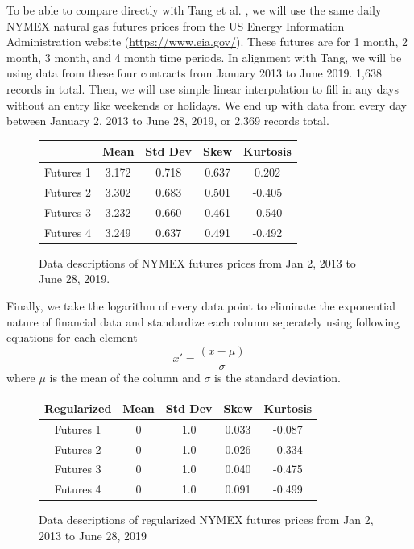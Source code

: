 \documentclass[final]{cvpr}
\begin{document}
    To be able to compare directly with Tang et al. \cite{tang}, we will use the
    same daily NYMEX natural gas futures prices from the US Energy Information
    Administration website (\url{https://www.eia.gov/}). These futures are for 1
    month, 2 month, 3 month, and 4 month time periods. In alignment with Tang,
    we will be using data from these four contracts from January 2013 to June
    2019. 1,638 records in total. Then, we will use simple linear interpolation 
    to fill in any days without an entry like weekends or holidays. We end up 
    with data from every day between January 2, 2013 to June 28, 2019, or 2,369 
    records total.

    \begin{figure}[h]
        \caption{Data descriptions of NYMEX futures prices from Jan 2, 2013 to
            June 28, 2019.} 
        \center
        \begin{tabular}{| c || c | c | c | c |}
            \hline 
            & Mean & Std Dev & Skew & Kurtosis\\ 
            \hline
            \hline
            Futures 1 & 3.172 & 0.718 & 0.637 &  0.202\\
            Futures 2 & 3.302 & 0.683 & 0.501 & -0.405\\
            Futures 3 & 3.232 & 0.660 & 0.461 & -0.540\\
            Futures 4 & 3.249 & 0.637 & 0.491 & -0.492\\
            \hline
        \end{tabular}
    \end{figure}

    Finally, we take the logarithm of every data point to eliminate the
    exponential nature of financial data and standardize each column seperately
    using following equations for each element
    \begin{equation}
        x' = \frac{(x-\mu)}{\sigma}
    \end{equation}
    where $\mu$ is the mean of the column and $\sigma$ is the standard 
    deviation.

    \begin{figure}[h]
        \caption{Data descriptions of regularized NYMEX futures prices from Jan 
            2, 2013 to June 28, 2019}
        \center
        \begin{tabular}{| c || c | c | c | c |}
            \hline 
            Regularized & Mean & Std Dev & Skew & Kurtosis\\ 
            \hline
            \hline
            Futures 1 & 0 & 1.0 & 0.033 & -0.087\\
            Futures 2 & 0 & 1.0 & 0.026 & -0.334\\
            Futures 3 & 0 & 1.0 & 0.040 & -0.475\\
            Futures 4 & 0 & 1.0 & 0.091 & -0.499\\
            \hline
        \end{tabular}
    \end{figure}
\end{document}
